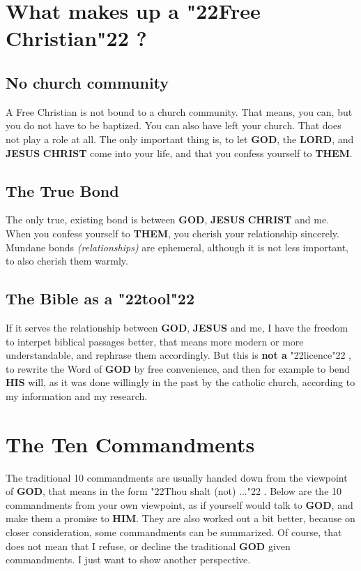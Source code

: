 \documentclass[12pt,a4paper]{article}
\newcommand{\Christ}[0]{\textbf{CHRIST}}
\newcommand{\God}[0]{\textbf{GOD}}
\newcommand{\Him}[0]{\textbf{HIM}}
\newcommand{\His}[0]{\textbf{HIS}}
\newcommand{\Jesus}[0]{\textbf{JESUS}}
\newcommand{\Lord}[0]{\textbf{LORD}}
\newcommand{\Them}[0]{\textbf{THEM}}
\newcommand{\q}[1]{\char"22{#1}\char"22 }
\begin{document}
	
	\section{What makes up a \q{Free Christian}?}
	
	\subsection{No church community}
		A Free Christian is not bound to a church community.
		That means,
		you can,
		but you do not have to be baptized.
		You can also have left your church.
		That does not play a role at all.
		The only important thing is,
		to let {\God},
		the {\Lord},
		and {\Jesus} {\Christ} come into your life,
		and that you confess yourself to {\Them}.
	
	\subsection{The True Bond}
		The only true,
		existing bond is between {\God},
		{\Jesus} {\Christ} and me.
		When you confess yourself to {\Them},
		you cherish your relationship sincerely.
		Mundane bonds \textit{(relationships)} are ephemeral,
		although it is not less important,
		to also cherish them warmly.
	
	\subsection{The Bible as a \q{tool}}
		If it serves the relationship between {\God},
		{\Jesus} and me,
		I have the freedom to interpet biblical passages better,
		that means more modern or more understandable,
		and rephrase them accordingly.
		But this is \textbf{not a} \q{licence},
		to rewrite the Word of {\God} by free convenience,
		and then for example to bend {\His} will,
		as it was done willingly in the past by the catholic church,
		according to my information and my research.
		
	\section{The Ten Commandments}
		The traditional 10 commandments are usually handed down from the viewpoint of {\God},
		that means in the form \q{Thou shalt (not) ...}.
		Below are the 10 commandments from your own viewpoint,
		as if yourself would talk to {\God},
		and make them a promise to {\Him}.
		They are also worked out a bit better,
		because on closer consideration,
		some commandments can be summarized.
		Of course,
		that does not mean that I refuse,
		or decline the traditional {\God} given commandments.
		I just want to show another perspective.
	
\end{document}
